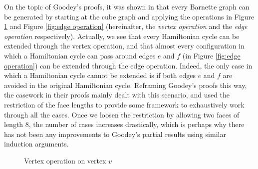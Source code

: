 \documentclass{scrartcl}
\theoremstyle{definition}
\theoremstyle{plain}
\begin{document}
On the topic of Goodey's proofs, it was shown in \cite{Holton1985-yo} that every Barnette graph can
be generated by starting at the cube graph and applying the operations in Figure
\ref{fig:vertex operation} and Figure \ref{fig:edge operation} (hereinafter, the
\textit{vertex operation} and the \textit{edge operation} respectively).
Actually, we see that every Hamiltonian cycle can be extended through the vertex operation, and
that almost every configuration in which a Hamiltonian cycle can pass around edges $e$ and $f$ (in
Figure \ref{fig:edge operation}) can be extended through the edge operation.
Indeed, the only case in which a Hamiltonian cycle cannot be extended is if both edges $e$ and $f$
are avoided in the original Hamiltonian cycle.
Reframing Goodey's proofs this way, the casework in their proofs mainly dealt with this scenario,
and used the restriction of the face lengths to provide some framework to exhaustively work through
all the cases.
Once we loosen the restriction by allowing two faces of length 8, the number of cases increases
drastically, which is perhaps why there has not been any improvements to Goodey's partial results
using similar induction arguments.

\begin{figure}
    \centering

    \caption{Vertex operation on vertex $v$}
    \label{fig:vertex operation}
\end{figure}
\end{document}
